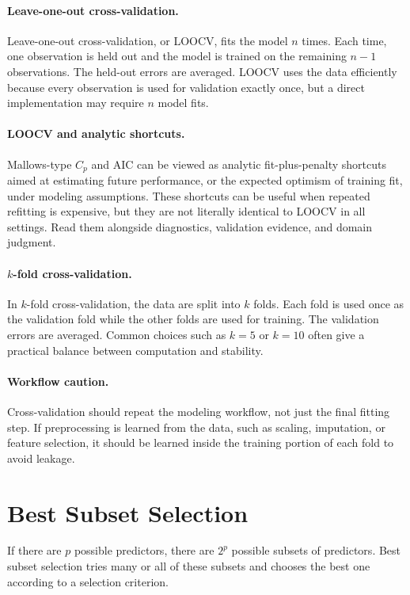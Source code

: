 \paragraph{Leave-one-out cross-validation.}
Leave-one-out cross-validation, or LOOCV, fits the model \(n\) times.  Each time, one observation is held out and the model is trained on the remaining \(n-1\) observations.  The held-out errors are averaged.  LOOCV uses the data efficiently because every observation is used for validation exactly once, but a direct implementation may require \(n\) model fits.

\paragraph{LOOCV and analytic shortcuts.}
Mallows-type \(C_p\) and AIC can be viewed as analytic fit-plus-penalty shortcuts aimed at estimating future performance, or the expected optimism of training fit, under modeling assumptions.  These shortcuts can be useful when repeated refitting is expensive, but they are not literally identical to LOOCV in all settings.  Read them alongside diagnostics, validation evidence, and domain judgment.

\paragraph{\(k\)-fold cross-validation.}
In \(k\)-fold cross-validation, the data are split into \(k\) folds.  Each fold is used once as the validation fold while the other folds are used for training.  The validation errors are averaged.  Common choices such as \(k=5\) or \(k=10\) often give a practical balance between computation and stability.

\paragraph{Workflow caution.}
Cross-validation should repeat the modeling workflow, not just the final fitting step.  If preprocessing is learned from the data, such as scaling, imputation, or feature selection, it should be learned inside the training portion of each fold to avoid leakage.

\section{Best Subset Selection}

If there are \(p\) possible predictors, there are \(2^p\) possible subsets of predictors.  Best subset selection tries many or all of these subsets and chooses the best one according to a selection criterion.

